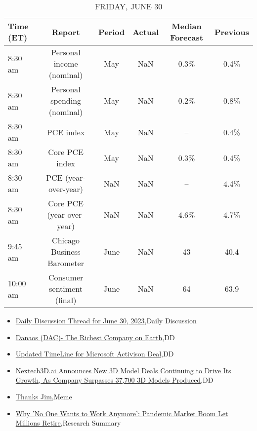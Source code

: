\documentclass{article}%
\begin{document}
\begin{table}[htbp]%
\caption{FRIDAY, JUNE 30}%
\centering%
\begin{adjustbox}{width=1\textwidth}%
\begin{tabular}{lccccc}
\toprule
Time (ET) &                      Report & Period & Actual & Median Forecast & Previous \\
\midrule
  8:30 am &   Personal income (nominal) &    May &    NaN &            0.3\% &     0.4\% \\
  8:30 am & Personal spending (nominal) &    May &    NaN &            0.2\% &     0.8\% \\
  8:30 am &                   PCE index &    May &    NaN &              -- &     0.4\% \\
  8:30 am &              Core PCE index &    May &    NaN &            0.3\% &     0.4\% \\
  8:30 am &        PCE (year-over-year) &    NaN &    NaN &              -- &     4.4\% \\
  8:30 am &   Core PCE (year-over-year) &    NaN &    NaN &            4.6\% &     4.7\% \\
  9:45 am &  Chicago Business Barometer &   June &    NaN &              43 &     40.4 \\
 10:00 am &  Consumer sentiment (final) &   June &    NaN &              64 &     63.9 \\
\bottomrule
\end{tabular}
%
\end{adjustbox}%
\end{table}

%
\begin{itemize}%
\item%
\href{https://reddit.com/r/wallstreetbets/comments/14mw4uz/daily\_discussion\_thread\_for\_june\_30\_2023/}{Daily Discussion Thread for June 30, 2023},Daily Discussion%
\item%
\href{https://reddit.com/r/wallstreetbets/comments/14mvw9x/danaos\_dac\_the\_richest\_company\_on\_earth/}{Danaos (DAC)- The Richest Company on Earth},DD%
\item%
\href{https://reddit.com/r/wallstreetbets/comments/14mplw9/updated\_timeline\_for\_microsoft\_activison\_deal/}{Updated TimeLine for Microsoft Activison Deal},DD%
\item%
\href{https://reddit.com/r/Baystreetbets/comments/14m8gp6/nextech3dai\_announces\_new\_3d\_model\_deals/}{Nextech3D.ai Announces New 3D Model Deals Continuing to Drive Its Growth, As Company Surpasses 37,700 3D Models Produced},DD%
\item%
\href{https://reddit.com/r/StockMarket/comments/14mqvqm/thanks\_jim/}{Thanks Jim},Meme%
\item%
\href{https://reddit.com/r/Economics/comments/14mx8mr/why\_no\_one\_wants\_to\_work\_anymore\_pandemic\_market/}{Why 'No One Wants to Work Anymore': Pandemic Market Boom Let Millions Retire},Research Summary%
\end{itemize}%
\end{document}
